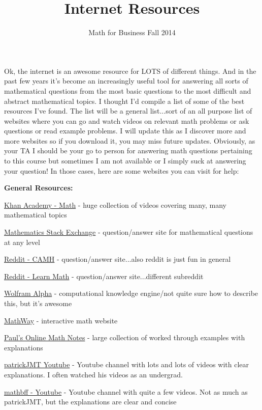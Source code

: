 \documentclass[12pt]{article}
\begin{document}
\title{Internet Resources}
\date{Math for Business Fall 2014}
\maketitle

Ok, the internet is an awesome resource for LOTS of different things. And in the past few years it's become an increasingly useful tool for answering all sorts of mathematical questions from the most basic questions to the most difficult and abstract mathematical topics. I thought I'd compile a list of some of the best resources I've found. The list will be a general list...sort of an all purpose list of websites where you can go and watch videos on relevant math problems or ask questions or read example problems. I will update this as I discover more and more websites so if you download it, you may miss future updates. Obviously, as your TA I should be your go to person for answering math questions pertaining to this course but sometimes I am not available or I simply suck at answering your question! In those cases, here are some websites you can visit for help:

\textbf{General Resources:}

\href{https://www.khanacademy.org/math}{Khan Academy - Math} - huge collection of videos covering many, many mathematical topics

\href{http://math.stackexchange.com/}{Mathematics Stack Exchange} - question/answer site for mathematical questions at any level

\href{http://www.reddit.com/r/cheatatmathhomework}{Reddit - CAMH} - question/answer site...also reddit is just fun in general

\href{http://www.reddit.com/r/learnmath}{Reddit - Learn Math} - question/answer site...different subreddit

\href{http://www.wolframalpha.com/}{Wolfram Alpha} - computational knowledge engine/not quite sure how to describe this, but it's awesome

\href{https://www.mathway.com/}{MathWay} - interactive math website

\href{http://tutorial.math.lamar.edu/}{Paul's Online Math Notes} - large collection of worked through examples with explanations

\href{https://www.youtube.com/user/patrickJMT}{patrickJMT Youtube} - Youtube channel with lots and lots of videos with clear explanations. I often watched his videos as an undergrad. 

\href{https://www.youtube.com/user/mathbff/videos}{mathbff - Youtube} - Youtube channel with quite a few videos. Not as much as patrickJMT, but the explanations are clear and concise
\end{document}
